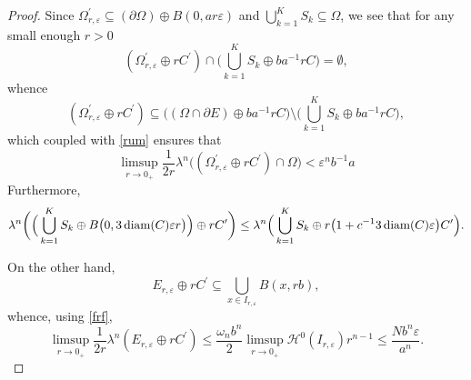\documentclass[pdflatex,sn-mathphys-num]{sn-jnl}
\theoremstyle{plain}
\theoremstyle{definition}
\DeclareMathOperator{\diam}{\textup{diam}}
\begin{document}
\begin{proof}
Since $\Omega^{\prime}_{r, \varepsilon}\subseteq (\partial\Omega)\oplus B(0, ar\varepsilon)$ and $\bigcup_{k=1}^K S_k\subseteq\Omega$, we see that for any small enough $r>0$  $$(\Omega^{\prime}_{r, \varepsilon}\oplus rC^{\prime})\cap \Big(\bigcup_{k=1}^K S_k\oplus ba^{-1}rC\Big)=\emptyset,$$ whence $$(\Omega^{\prime}_{r, \varepsilon}\oplus rC^{\prime})\subseteq \big((\Omega\cap\partial E)\oplus ba^{-1}rC\big)\setminus\Big(\bigcup_{k=1}^K S_k\oplus ba^{-1}rC\Big),$$ which coupled with \eqref{rum} ensures that \begin{equation}\label{rumík}
    \limsup_{r\to0_+}\frac{1}{2r}\lambda^n\big((\Omega^{\prime}_{r, \varepsilon}\oplus rC^{\prime})\cap\Omega\big)<\varepsilon^n b^{-1}a
\end{equation} Furthermore, \begin{equation}\label{rumcajs}
    \begin{split}
        \lambda^n\bigg(\Big(\bigcup_{k=1}^K S_k\oplus B\big(0, 3\diam(C)\varepsilon r\big)\Big) \oplus rC^{\prime}\bigg)\leq \lambda^n\Big(\bigcup_{k=1}^K S_k\oplus r\big(1+c^{-1}3\diam(C)\varepsilon\big)C^{\prime}\Big).
    \end{split}
\end{equation}


On the other hand, 
\[
E_{r, \varepsilon} \oplus rC^{\prime}\subseteq \bigcup_{x\in I_{r, \varepsilon}} B(x, rb),
\]
whence, using \eqref{frf}, \begin{equation}\label{konec}
    \limsup_{r\to0_+}\frac{1}{2r}\lambda^n(E_{r, \varepsilon} \oplus rC^{\prime})\leq\frac{\omega_n b^n}{2}\limsup_{r\to0_+}\mathcal{H}^0(I_{r, \varepsilon})r^{n-1}\leq \frac{N b^n\varepsilon}{a^n}.\end{equation}


\end{proof}
\end{document}
